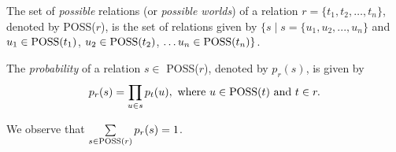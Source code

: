 
\begin{definition}
\begin{rm}
The set of {\em possible} relations (or {\em possible worlds}) 
of a relation $r = \{t_1, t_2, \ldots, t_n\}$, denoted by POSS($r$),
is the set of relations given by
$\{s \mid s = \{u_1, u_2, ..., u_n\}$ and 
$u_1 \in {\rm POSS}(t_1)$, $u_2 \in {\rm POSS}(t_2)$,
$\ldots u_n \in {\rm POSS}(t_n)\}$.

The {\em probability} of a relation $s \in$ POSS($r$),
denoted by $p_r(s)$, is given by 
\begin{displaymath}
p_r(s) = \prod_{u \in s} p_t(u), \mbox{ where } u \in {\rm POSS}(t) 
\mbox{ and } t \in r. 
\end{displaymath}
\end{rm}
\end{definition}
\medskip

We observe that $\sum\limits_{s \in {\rm POSS}(r)} p_r(s) = 1$. 

\medskip

